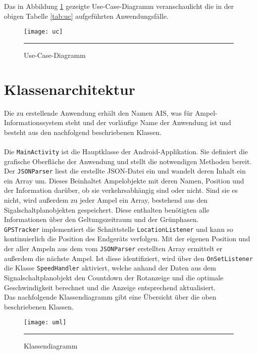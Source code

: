 Das in Abbildung \ref{fig:uc} gezeigte Use-Case-Diagramm veranschaulicht die in der obigen Tabelle \ref{tab:uc} aufgeführten Anwendungsfälle.  
\begin{figure}[H]  
    \centering  
    \texttt{[image: uc]} 
    \caption{Use-Case-Diagramm}
      \rule{35em}{0.5pt}
    \label{fig:uc}
\end{figure}
\section{Klassenarchitektur}
Die zu erstellende Anwendung erhält den Namen AIS, was für Ampel-Informationssystem steht und der vorläufige Name der Anwendung ist und besteht aus den nachfolgend beschriebenen Klassen. \\\\
Die \texttt{MainActivity} ist die Hauptklasse der Android-Applikation. Sie definiert die grafische Oberfläche der Anwendung und stellt die notwendigen Methoden bereit. \\
Der \texttt{\gls{JSON}Parser} liest die erstellte \gls{JSON}-Datei ein und wandelt deren Inhalt ein ein Array um. Dieses Beinhaltet Ampelobjekte mit deren Namen, Position und der Information darüber, ob sie verkehrsabhängig sind oder nicht. Sind sie es nicht, wird außerdem zu jeder Ampel ein Array, bestehend aus den Sigalschaltplanobjekten gespeichert. Diese enthalten benötigten alle Informationen über den Geltungszeitraum und der Grünphasen.\\ 
\texttt{GPSTracker} implementiert die Schnittstelle \texttt{LocationListener} und kann so kontinuierlich die Position des Endgeräts verfolgen. Mit der eigenen Position und der aller Ampeln aus dem vom \texttt{JSONParser} erstellten Array ermittelt er außerdem die nächste Ampel. Ist diese identifiziert, wird über den \texttt{OnSetListener} die Klasse \texttt{SpeedHandler} aktiviert, welche anhand der Daten aus dem Signalschaltplanobjekt den Countdown der Rotanzeige und die optimale Geschwindigkeit berechnet und die Anzeige entsprechend aktualisiert. \\
Das nachfolgende Klassendiagramm gibt eine Übersicht über die oben beschriebenen Klassen.
\begin{figure}[H]  
    \centering  
    \texttt{[image: uml]} 
    \rule{35em}{0.5pt}
    \caption{Klassendiagramm}
    \label{fig:uml}
\end{figure}

